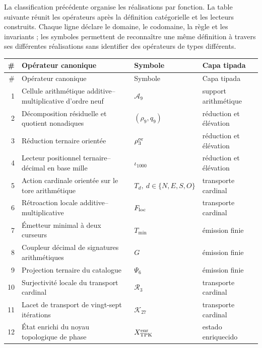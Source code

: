 La classification précédente organise les réalisations par fonction. La table suivante
réunit les opérateurs après la définition catégorielle et les lecteurs
construits. Chaque ligne déclare le domaine, le codomaine, la règle et les invariants ; les
symboles permettent de reconnaître une même définition à travers ses
différentes réalisations sans identifier des opérateurs de types différents.

\begingroup
\footnotesize
\renewcommand{\arraystretch}{1.06}

\begin{longtable}{@{}r >{\raggedright\arraybackslash}p{}
  >{\raggedright\arraybackslash}p{}
  >{\raggedright\arraybackslash}p{}@{}}
\toprule
\# & Opérateur canonique & Symbole & Capa tipada \\
\midrule
\endfirsthead
\toprule
\# & Opérateur canonique & Symbole & Capa tipada \\
\midrule
\endhead
1 & Cellule arithmétique additive--multiplicative d'ordre neuf
  & \(\mathcal A_9\) & support arithmétique \\
2 & Décomposition résiduelle et quotient nonadiques
  & \((\rho_9,q_9)\) & réduction et élévation \\
3 & Réduction ternaire orientée
  & \(\rho_3^{\rm or}\) & réduction et élévation \\
4 & Lecteur positionnel ternaire--décimal en base mille
  & \(\iota_{1000}\) & réduction et élévation \\
5 & Action cardinale orientée sur le tore arithmétique
  & \(T_d,\ d\in\{N,E,S,O\}\) & transporte cardinal \\
6 & Rétroaction locale additive--multiplicative
  & \(F_{\rm loc}\) & transporte cardinal \\
7 & Émetteur minimal à deux curseurs
  & \(T_{\min}\) & émission finie \\
8 & Coupleur décimal de signatures arithmétiques
  & \(G\) & émission finie \\
9 & Projection ternaire du catalogue
  & \(\Psi_6\) & émission finie \\
10 & Surjectivité locale du transport cardinal
  & \(\mathcal R_3\) & transporte cardinal \\
11 & Lacet de transport de vingt-sept itérations
  & \(\mathcal K_{27}\) & transporte cardinal \\
12 & État enrichi du noyau topologique de phase
  & \(\mathcal X_{\rm TPK}^{\rm enr}\) & estado enriquecido \\

\end{longtable}
